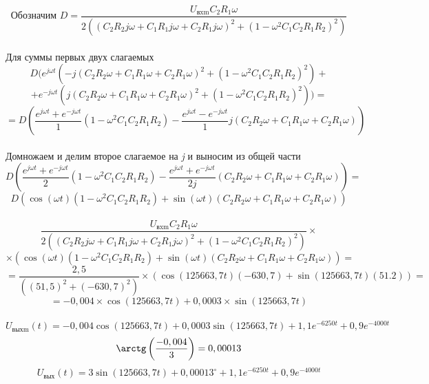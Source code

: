 \documentclass[12pt, a4paper]{report}
\begin{document}
    \[ \text{Обозначим} \textit{ D} = \frac{U_\text{вxm}C_{2}R_1\omega} {2((C_{2}R_{2}j\omega + C_{1}R_{1}j\omega + C_{2}R_{1}j\omega)^2 + (1 - \omega^2C_{1}C_{2}R_{1}R_{2})^2)} \]\\
    Для суммы первых двух слагаемых
    \[ D(e^{j\omega t}(-j(C_{2}R_{2}\omega + C_{1}R_{1}\omega + C_{2}R_{1}\omega)^2 + (1 - \omega^2C_{1}C_{2}R_{1}R_{2})^2) + \]
    \[ + e^{-j\omega t}(j(C_{2}R_{2}\omega + C_{1}R_{1}\omega + C_{2}R_{1}\omega)^2 + (1 - \omega^2C_{1}C_{2}R_{1}R_{2})^2)) = \]
    \[ = D\left( \frac{e^{j\omega t} + e^{-j\omega t}}{1} (1 - \omega^2C_{1}C_{2}R_{1}R_{2}) - \frac{e^{j\omega t} - e^{-j\omega t}}{1} j(C_{2}R_{2}\omega + C_{1}R_{1}\omega + C_{2}R_{1}\omega) \right) \]\\
    Домножаем и делим второе слагаемое на \textit{j} и выносим из общей части 
    \[ D\left( \frac{e^{j\omega t} + e^{-j\omega t}}{2} (1 - \omega^2C_{1}C_{2}R_{1}R_{2}) - \frac{e^{j\omega t} + e^{-j\omega t}}{2j}(C_{2}R_{2}\omega + C_{1}R_{1}\omega + C_{2}R_{1}\omega) \right) = \]
    \[ D\left( \cos(\omega t)(1 - \omega^2C_{1}C_{2}R_{1}R_{2}) + \sin(\omega t)(C_{2}R_{2}\omega + C_{1}R_{1}\omega + C_{2}R_{1}\omega) \right) \]\\
    \[ \frac{U_\text{вxm}C_{2}R_1\omega} {2((C_{2}R_{2}j\omega + C_{1}R_{1}j\omega + C_{2}R_{1}j\omega)^2 + (1 - \omega^2C_{1}C_{2}R_{1}R_{2})^2)} \times \]
    \[ \times \left( \cos(\omega t)(1 - \omega^2C_{1}C_{2}R_{1}R_{2}) + \sin(\omega t)(C_{2}R_{2}\omega + C_{1}R_{1}\omega + C_{2}R_{1}\omega) \right) = \]
    \[ = \frac{2,5} {((51,5)^2 + (-630,7)^2)} \times \left( \cos(125663,7t)(-630,7) + \sin(125663,7t)(51.2) \right) = \]
    \[ = -0,004 \times \cos(125663,7t) + 0,0003 \times \sin(125663,7t) \]\\
    \[ U_\text{выхm}(t) = -0,004\cos(125663,7t) + 0,0003\sin(125663,7t) + 1,1e^{-6250t} + 0,9e^{-4000t} \]
    \[ \arctg\left( \frac{-0,004}{3} \right) = 0,00013 \]
    \[ U_\text{вых}(t) = 3\sin(125663,7t) + 0,00013^{\circ} + 1,1e^{-6250t} + 0,9e^{-4000t} \]

    \newpage
\end{document}
